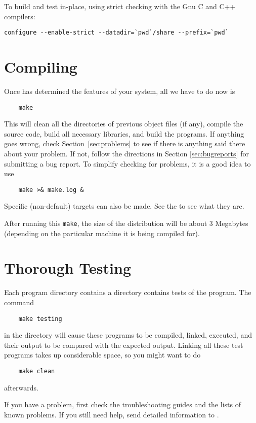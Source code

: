 {To build and test in-place, using strict checking with the Gnu C and C++
compilers: 
\begin{verbatim}
configure --enable-strict --datadir=`pwd`/share --prefix=`pwd`
\end{verbatim}

\section{Compiling \sowing}
\label{sec:compiling}

Once  has determined the features of your system, all we have
to do now is 
\begin{verbatim}
    make
\end{verbatim}
This will clean all the directories of previous object files (if any), compile
the source code, build all necessary
libraries, and build the programs.  If anything goes wrong, check
Section~\ref{sec:problems} to see if there is anything said there about your
problem.  If not, follow the directions in Section \ref{sec:bugreports} for
submitting a bug report.  To simplify checking for problems, it is a good idea
to use 
\begin{verbatim}
    make >& make.log &
\end{verbatim}
Specific (non-default) targets can also be made.  See the  to
see what they are.

After running this {\tt make}, the size of the distribution will be about 3
Megabytes (depending on the particular machine it is being compiled for). 

\section{Thorough Testing}
\label{sec:thorough}
\label{sec-tests}

Each program directory contains a  directory contains tests of
the program.
The command
\begin{verbatim}
    make testing
\end{verbatim}
in the  directory will cause these programs to be
compiled, linked, executed, and their output to be compared with the expected
output.  Linking all these test programs takes up considerable space, so you
might want to do 
\begin{verbatim}
    make clean
\end{verbatim}
afterwards.  

If you have a problem, first check the troubleshooting guides and the lists of
known problems.  If you still need help, send detailed information to
. 

}
